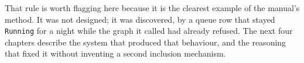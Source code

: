 That rule is worth flagging here because it is the clearest example of the manual's method. It was
not designed; it was discovered, by a queue row that stayed \texttt{Running} for a night while the
graph it called had already refused. The next four chapters describe the system that produced that
behaviour, and the reasoning that fixed it without inventing a second inclusion mechanism.
